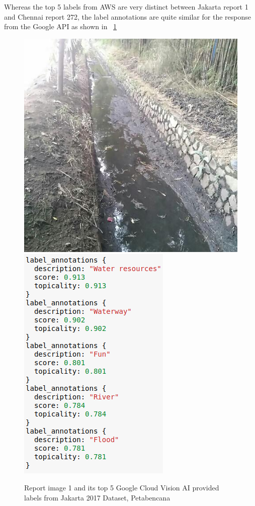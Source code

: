 Whereas the top 5 labels from AWS are very distinct between Jakarta report 1 and 
Chennai report 272, the label annotations are quite similar for the response
from the Google API as shown in \figureautorefname{}~\ref{fig:goog_1}
\begin{figure}[ht]
    \centering
    \captionsetup{justification=centering}
    \includegraphics[scale=0.3]{images/id/1.jpeg}
    \includegraphics[scale=0.6]{images/id/goog_1.png}
    \caption{Report image 1 and its top 5 Google Cloud Vision AI provided
    labels from Jakarta 2017 Dataset, Petabencana}\label{fig:goog_1}
\end{figure}

